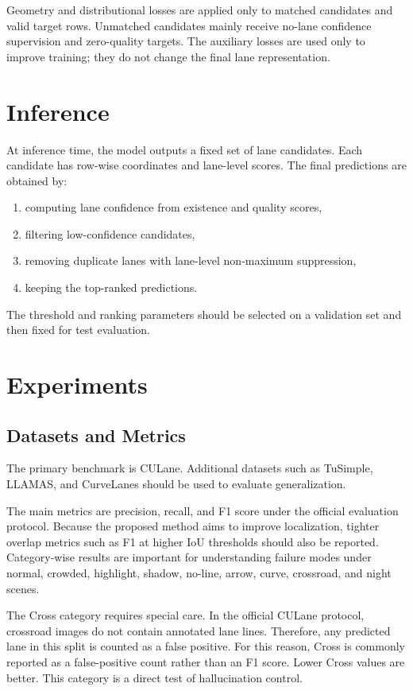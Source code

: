 \documentclass[conference]{IEEEtran}
\begin{document}
Geometry and distributional losses are applied only to matched candidates and valid target rows. Unmatched candidates mainly receive no-lane confidence supervision and zero-quality targets. The auxiliary losses are used only to improve training; they do not change the final lane representation.

\section{Inference}

At inference time, the model outputs a fixed set of lane candidates. Each candidate has row-wise coordinates and lane-level scores. The final predictions are obtained by:

\begin{enumerate}
    \item computing lane confidence from existence and quality scores,
    \item filtering low-confidence candidates,
    \item removing duplicate lanes with lane-level non-maximum suppression,
    \item keeping the top-ranked predictions.
\end{enumerate}

The threshold and ranking parameters should be selected on a validation set and then fixed for test evaluation.

\section{Experiments}

\subsection{Datasets and Metrics}

The primary benchmark is CULane. Additional datasets such as TuSimple, LLAMAS, and CurveLanes should be used to evaluate generalization.

The main metrics are precision, recall, and F1 score under the official evaluation protocol. Because the proposed method aims to improve localization, tighter overlap metrics such as F1 at higher IoU thresholds should also be reported. Category-wise results are important for understanding failure modes under normal, crowded, highlight, shadow, no-line, arrow, curve, crossroad, and night scenes.

The Cross category requires special care. In the official CULane protocol, crossroad images do not contain annotated lane lines. Therefore, any predicted lane in this split is counted as a false positive. For this reason, Cross is commonly reported as a false-positive count rather than an F1 score. Lower Cross values are better. This category is a direct test of hallucination control.
\end{document}
